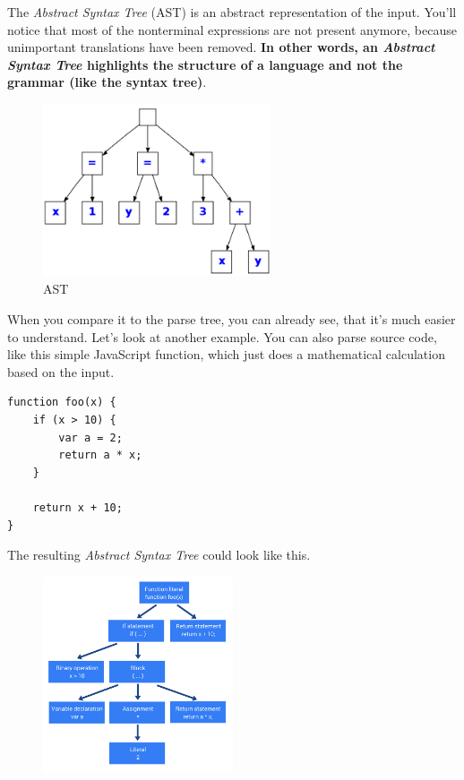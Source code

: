 The \textit{Abstract Syntax Tree} (AST) is an abstract representation of the input. You'll notice that most of the nonterminal expressions are not present anymore, because unimportant translations have been removed.\textbf{ In other words, an \textit{Abstract Syntax Tree} highlights the structure of a language and not the grammar (like the syntax tree)}. 

\begin{figure}[H]
    \centering
        \includegraphics[width=0.6\textwidth]{figures/ast.png}
        \caption{AST}
\end{figure}

When you compare it to the parse tree, you can already see, that it's much easier to understand. Let's look at another example. You can also parse source code, like this simple JavaScript function, which just does a mathematical calculation based on the input. 

\begin{verbatim}
function foo(x) {
    if (x > 10) {
        var a = 2;
        return a * x;
    }

    return x + 10;
}
\end{verbatim}

The resulting \textit{Abstract Syntax Tree} could look like this. 

\begin{figure}[H]
    \centering
        \includegraphics[width=0.5\textwidth]{figures/javascript_ast.png}
\end{figure}

